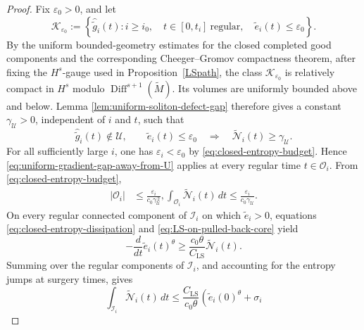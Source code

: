 \documentclass{amsart}
\begin{document}
\begin{proof}
\noindent Fix \(\varepsilon_0>0\), and let
\[
        \mathscr K_{\varepsilon_0}
        :=
        \left\{
        \widehat{\widetilde g}_i(t):
        i\geq i_0,\quad
        t\in[0,t_i]\ \text{regular},\quad
        \widetilde e_i(t)\leq\varepsilon_0
        \right\}.
\]
By the uniform bounded-geometry estimates for the closed completed
good components and the corresponding Cheeger--Gromov compactness
theorem, after fixing the \(H^s\)-gauge used in
Proposition~\ref{LSpath}, the class
\(\mathscr K_{\varepsilon_0}\) is relatively compact in \(H^s\)
modulo \(\operatorname{Diff}^{s+1}(\widetilde M)\). Its volumes are
uniformly bounded above and below. Lemma
\ref{lem:uniform-soliton-defect-gap} therefore gives a constant
\(\gamma_{\mathcal U}>0\), independent of \(i\) and \(t\), such
that
\begin{equation}
\label{eq:uniform-gradient-gap-away-from-U}
        \widehat{\widetilde g}_i(t)\notin\mathcal U,
        \qquad
        \widetilde e_i(t)\leq\varepsilon_0
        \quad\Longrightarrow\quad
        \widetilde{\mathcal N}_i(t)
        \geq\gamma_{\mathcal U}.
\end{equation}
For all sufficiently large \(i\), one has
\(\varepsilon_i<\varepsilon_0\) by \eqref{eq:closed-entropy-budget}.
Hence \eqref{eq:uniform-gradient-gap-away-from-U} applies at every
regular time \(t\in\mathcal O_i\). From \eqref{eq:closed-entropy-budget},
\begin{equation}
\label{eq:outside-core-L1}
\begin{aligned}
        |\mathcal O_i|
        &\leq
        \frac{\varepsilon_i}
        {c_0\gamma_{\mathcal U}^{\,2}},\int_{\mathcal O_i}
        \widetilde{\mathcal N}_i(t)\,dt
        \leq
        \frac{\varepsilon_i}
        {c_0\gamma_{\mathcal U}}.
\end{aligned}
\end{equation}
On every regular connected component of \(\mathcal I_i\) on which
\(\widetilde e_i>0\), equations
\eqref{eq:closed-entropy-dissipation} and
\eqref{eq:LS-on-pulled-back-core} yield
\[
        -\frac{d}{dt}\widetilde e_i(t)^\theta
        \geq
        \frac{c_0\theta}{C_{\mathrm{LS}}}
        \widetilde{\mathcal N}_i(t).
\]
Summing over the regular components of \(\mathcal I_i\), and accounting
for the entropy jumps at surgery times, gives
\begin{equation}
\label{eq:inside-core-L1}
        \int_{\mathcal I_i}
        \widetilde{\mathcal N}_i(t)\,dt
        \leq
        \frac{C_{\mathrm{LS}}}{c_0\theta}
        \left(
        \widetilde e_i(0)^\theta+\sigma_i

\end{equation}
\end{proof}
\end{document}
